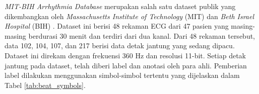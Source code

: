 \textit{MIT-BIH Arrhythmia Database} merupakan salah satu dataset publik yang dikembangkan oleh \textit{Massachusetts Institute of Technology} (MIT) dan \textit{Beth Israel Hospital} (BIH) \parencite{moodyImpactMITBIHArrhythmia2001}.
Dataset ini berisi 48 rekaman ECG dari 47 pasien yang masing-masing berdurasi 30 menit dan terdiri dari dua kanal.
Dari 48 rekaman tersebut, data 102, 104, 107, dan 217 berisi data detak jantung yang sedang dipacu.
Dataset ini direkam dengan frekuensi 360 Hz dan resolusi 11-bit.
Setiap detak jantung pada dataset, telah diberi label dan anotasi oleh para ahli.
Pemberian label dilakukan menggunakan simbol-simbol tertentu yang dijelaskan dalam Tabel \ref{tab:beat_symbols}.



